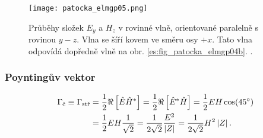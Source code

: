          \begin{figure}[ht!]
            \centering
            \texttt{[image: patocka\_elmgp05.png]}
            \caption{Průběhy složek \(E_y\) a \(H_z\) v rovinné vlně, orientované paralelně s 
                     rovinou \(y-z\). Vlna se šíří kovem ve směru osy \(+x\). Tato vlna odpovídá 
                     dopředně vlně na obr. \ref{es:fig_patocka_elmgp04b}. \cite[s.~80]{Patocka4}.}
            \label{ES:fig_elmgp05}
          \end{figure}
                
        \subsubsection{Poyntingův vektor}
          \begin{align}\
            \Gamma_\text{č} \equiv \Gamma_\text{stř} 
              &= \frac{1}{2}\Re\left[\hat{E}\hat{H}^*\right] 
               = \frac{1}{2}\Re\left[\hat{E}^*\hat{H}\right]     
               = \frac{1}{2}EH\cos(\SI{45}{\degree})                 \nonumber \\ 
              &= \frac{1}{2}EH\frac{1}{\sqrt{2}}
               = \frac{1}{2\sqrt{2}}\frac{E^2}{\left\lvert Z\right\rvert}
               = \frac{1}{2\sqrt{2}}H^2\left\lvert Z\right\rvert.                      \label{ES:eq_elmagp52}
          \end{align}

